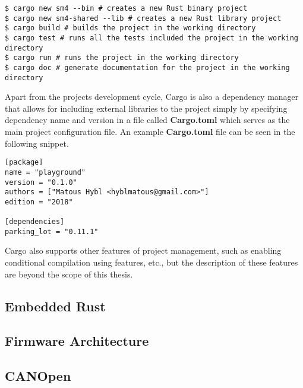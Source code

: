 \begin{lstlisting}
$ cargo new sm4 --bin # creates a new Rust binary project
$ cargo new sm4-shared --lib # creates a new Rust library project
$ cargo build # builds the project in the working directory
$ cargo test # runs all the tests included the project in the working directory
$ cargo run # runs the project in the working directory
$ cargo doc # generate documentation for the project in the working directory
\end{lstlisting}

Apart from the projects development cycle, Cargo is also a dependency manager that allows for including external libraries to the project simply by specifying dependency name and version in a file called \textbf{Cargo.toml} which serves as the main project configuration file.
An example \textbf{Cargo.toml} file can be seen in the following snippet.

\begin{lstlisting}
[package]
name = "playground"
version = "0.1.0"
authors = ["Matous Hybl <hyblmatous@gmail.com>"]
edition = "2018"

[dependencies]
parking_lot = "0.11.1"
\end{lstlisting}

Cargo also supports other features of project management, such as enabling conditional compilation using features, etc., but the description of these features are beyond the scope of this thesis.

\subsection{Embedded Rust}
\label{subsec:embedded_rust}

\subsection{Firmware Architecture} %
\subsection{CANOpen}
